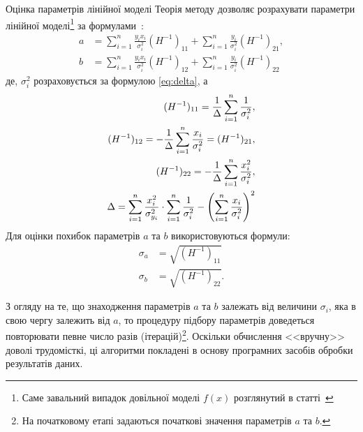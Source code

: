 \documentclass{LabBook}
\begin{document}
  \begin{More}{Оцінка параметрів лінійної моделі}
    Теорія методу дозволяє розрахувати параметри лінійної моделі\footnote{Саме завальний випадок довільної моделі $f(x)$ розглянутий в статті~\cite{OREAR_LS}} за формулами~\cite{OREAR_LS}:
    \begin{align*}\label{}
      a & =\sum\limits_{i = 1}^n \frac{y_i x_i}{\sigma_{i}^2} (H^{-1})_{11} + \sum\limits_{i = 1}^n \frac{y_i}{\sigma_{i}^2} (H^{-1})_{21}, \\
      b & =\sum\limits_{i = 1}^n \frac{y_i x_i}{\sigma_{i}^2} (H^{-1})_{12} + \sum\limits_{i = 1}^n \frac{y_i}{\sigma_{i}^2} (H^{-1})_{22}
    \end{align*}
    де, $\sigma_i^2$ розраховується за формулою \eqref{eq:delta}, а
    \begin{align*}\label{}
      (H^{-1})_{11} = \frac1\Delta \sum\limits_{i = 1}^n \frac{1}{\sigma_{i}^2},                       \\
      (H^{-1})_{12} =-  \frac1\Delta \sum\limits_{i = 1}^n  \frac{x_i}{\sigma_{i}^2} = (H^{-1})_{21} , \\
      (H^{-1})_{22} =-  \frac1\Delta \sum\limits_{i = 1}^n \frac{x_i^2}{\sigma_{i}^2},                 \\
      \Delta =   \sum\limits_{i = 1}^n \frac{x_i^2}{\sigma_{y_i}^2} \cdot \sum\limits_{i = 1}^n \frac{1}{\sigma_{i}^2} - \left(\sum\limits_{i = 1}^n \frac{x_i}{\sigma_{i}^2} \right)^2
    \end{align*}
    Для оцінки похибок параметрів $a$ та $b$ використовуються формули:
    \begin{align*}
      \sigma_a & = \sqrt{(H^{-1})_{11} } \\
      \sigma_b & = \sqrt{(H^{-1})_{22}}.
    \end{align*}

    З огляду на те, що знаходження параметрів $a$ та $b$ залежать від величини $\sigma_i$, яка в свою чергу залежить від $a$, то процедуру підбору параметрів доведеться повторювати певне число разів (ітерацій)\footnote{На початковому етапі задаються початкові значення параметрів $a$  та $b$.}. Оскільки обчислення <<вручну>> доволі трудомісткі, ці алгоритми покладені в основу програмних засобів обробки результатів даних.
  \end{More}

\end{document}
